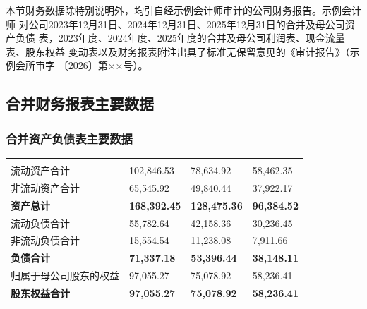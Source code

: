 
本节财务数据除特别说明外，均引自经示例会计师审计的公司财务报告。示例会计师
对公司2023年12月31日、2024年12月31日、2025年12月31日的合并及母公司资产负债
表，2023年度、2024年度、2025年度的合并及母公司利润表、现金流量表、股东权益
变动表以及财务报表附注出具了标准无保留意见的《审计报告》（示例会所审字
〔2026〕第××号）。

\subsection{合并财务报表主要数据}

\subsubsection{合并资产负债表主要数据}

\begin{gstab}
\begin{longtable}{|L{49mm}|R{29mm}|R{29mm}|R{29mm}|}
\hline
{} &  &  &  \\ \hline
\endfirsthead
\hline
{} &  &  &  \\ \hline
\endhead
流动资产合计 & 102,846.53 & 78,634.92 & 58,462.35 \\ \hline
非流动资产合计 & 65,545.92 & 49,840.44 & 37,922.17 \\ \hline
{\bfseries 资产总计} & {\bfseries 168,392.45} & {\bfseries 128,475.36} & {\bfseries 96,384.52} \\ \hline
流动负债合计 & 55,782.64 & 42,158.36 & 30,236.45 \\ \hline
非流动负债合计 & 15,554.54 & 11,238.08 & 7,911.66 \\ \hline
{\bfseries 负债合计} & {\bfseries 71,337.18} & {\bfseries 53,396.44} & {\bfseries 38,148.11} \\ \hline
归属于母公司股东的权益 & 97,055.27 & 75,078.92 & 58,236.41 \\ \hline
{\bfseries 股东权益合计} & {\bfseries 97,055.27} & {\bfseries 75,078.92} & {\bfseries 58,236.41} \\ \hline
\end{longtable}
\end{gstab}

